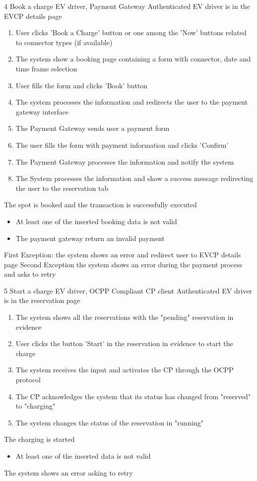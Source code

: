 \usecase
{4}
{Book a charge}
{EV driver, Payment Gateway}
{Authenticated EV driver is in the EVCP details page}
{
    \begin{enumerate}
        \item User clicks 'Book a Charge' button or one among the 'Now' buttons related to connector types (if available)
        \item The system show a booking page containing a form with connector, date and time frame selection
        \item User fills the form and clicks 'Book' button
        \item The system processes the information and redirects the user to the payment gateway interface
        \item The Payment Gateway sends user a payment form
        \item The user fills the form with payment information and clicks 'Confirm'
        \item The Payment Gateway processes the information and notify the system
        \item The System processes the information and show a success message redirecting the user to the reservation tab
    \end{enumerate}
}
{The spot is booked and the transaction is successfully executed}
{
    \begin{itemize}
        \item At least one of the inserted booking data is not valid
        \item The payment gateway return an invalid payment
    \end{itemize}
}
{
    First Exception: the system shows an error and redirect user to EVCP details page
    Second Exception the system shows an error during the payment process and asks to retry
}

\usecase
{5}
{Start a charge}
{EV driver, OCPP Compliant CP client}
{Authenticated EV driver is in the reservation page}
{
    \begin{enumerate}
        \item The system shows all the reservations with the "pending" reservation in evidence
        \item User clicks the button 'Start' in the reservation in evidence to start the charge
        \item The system receives the input and activates the CP through the OCPP protocol
        \item The CP acknowledges the system that its status has changed from "reserved" to "charging"
        \item The system changes the status of the reservation in "running"
    \end{enumerate}
}
{The charging is started}
{
    \begin{itemize}
        \item At least one of the inserted data is not valid
    \end{itemize}
}
{
    The system shows an error asking to retry
}

